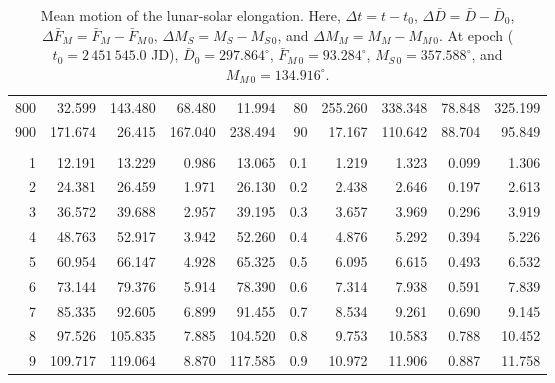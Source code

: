 \begin{table}[h!]
{\begin{tabular}{rrrrr|rrrrr}
800 &  32.599 & 143.480 &  68.480 &  11.994 & 80 & 255.260 & 338.348 &  78.848 & 325.199\\
900 & 171.674 &  26.415 & 167.040 & 238.494 & 90 &  17.167 & 110.642 &  88.704 &  95.849\\
&&&&&&&&&\\
1 &  12.191 &  13.229 &   0.986 &  13.065 & 0.1 &   1.219 &   1.323 &   0.099 &   1.306\\
2 &  24.381 &  26.459 &   1.971 &  26.130 & 0.2 &   2.438 &   2.646 &   0.197 &   2.613\\
3 &  36.572 &  39.688 &   2.957 &  39.195 & 0.3 &   3.657 &   3.969 &   0.296 &   3.919\\
4 &  48.763 &  52.917 &   3.942 &  52.260 & 0.4 &   4.876 &   5.292 &   0.394 &   5.226\\
5 &  60.954 &  66.147 &   4.928 &  65.325 & 0.5 &   6.095 &   6.615 &   0.493 &   6.532\\
6 &  73.144 &  79.376 &   5.914 &  78.390 & 0.6 &   7.314 &   7.938 &   0.591 &   7.839\\
7 &  85.335 &  92.605 &   6.899 &  91.455 & 0.7 &   8.534 &   9.261 &   0.690 &   9.145\\
8 &  97.526 & 105.835 &   7.885 & 104.520 & 0.8 &   9.753 &  10.583 &   0.788 &  10.452\\
9 & 109.717 & 119.064 &   8.870 & 117.585 & 0.9 &  10.972 &  11.906 &   0.887 &  11.758\\
\end{tabular}}
\caption{Mean motion of the lunar-solar elongation.  Here, $\Delta t = t-t_0$, $\Delta \bar{D}= \bar{D}-\bar{D}_0$, $\Delta \bar{F}_M= \bar{F}_M-\bar{F}_{M\,0}$,  
$\Delta M_S = M_S - M_{S\,0}$, and $\Delta M_M= M_M-M_{M\,0}$. 
At epoch  ($t_0 = 2\,451\,545.0$ JD), $\bar{D}_0 = 297.864^\circ$, $\bar{F}_{M\,0} = 93.284^\circ$,
$M_{S\,0} = 357.588^\circ$, and $M_{M\,0} = 134.916^\circ$. }\label{telon}
\end{table}


